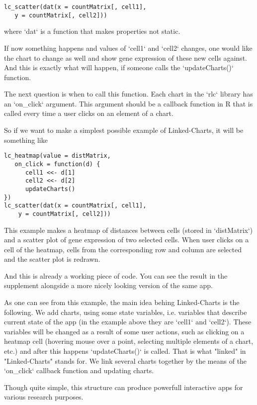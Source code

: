 \documentclass[twocolumn,10pt]{article}
\begin{document}
\begin{verbatim}
lc_scatter(dat(x = countMatrix[, cell1], 
   y = countMatrix[, cell2]))
\end{verbatim}

where `dat` is a function that makes properties not static.

If now something happens and values of `cell1` and `cell2` changes, one would like the chart to change as well and show gene expression of these new cells against. And this is exactly what will happen, if someone calls the `updateCharts()` function. 

The next question is when to call this function. Each chart in the `rlc` library has an `on_click` argument. This argument should be a callback function in R that is called every time a user clicks on an element of a chart.

So if we want to make a simplest possible example of Linked-Charts, it will be something like

\begin{verbatim}
lc_heatmap(value = distMatrix, 
   on_click = function(d) {
      cell1 <<- d[1]
      cell2 <<- d[2]
      updateCharts()
})
lc_scatter(dat(x = countMatrix[, cell1],
	y = countMatrix[, cell2]))
\end{verbatim}

This example makes a heatmap of distances between cells (stored in `distMatrix`) and a scatter plot of gene expression of two selected cells. When user clicks on a cell of the heatmap, cells from the corresponding row and column are selected and the scatter plot is redrawn.

And this is already a working piece of code. You can see the result in the supplement alongside a more nicely looking version of the same app.

As one can see from this example, the main idea behing Linked-Charts is the following. We add charts, using some state variables, i.e. variables that describe current state of the app (in the example above they are `cell1` and `cell2`). These variables will be changed as a result of some user actions, such as clicking on a heatmap cell (hovering mouse over a point, selecting multiple elements of a chart, etc.) and after this happens `updateCharts()` is called. That is what "linked" in "Linked-Charts" stands for. We link several charts together by the means of the `on_click` callback function and updating charts.

Though quite simple, this structure can produce powerfull interactive apps for various research purposes.
\end{document}
